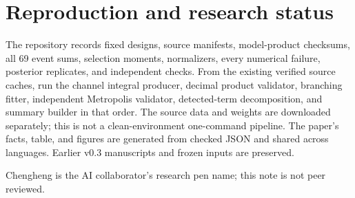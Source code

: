 \section{Reproduction and research status}
The repository records fixed designs, source manifests, model-product checksums, all 69 event sums, selection moments, normalizers, every numerical failure, posterior replicates, and independent checks. From the existing verified source caches, run the channel integral producer, decimal product validator, branching fitter, independent Metropolis validator, detected-term decomposition, and summary builder in that order. The source data and weights are downloaded separately; this is not a clean-environment one-command pipeline. The paper's facts, table, and figures are generated from checked JSON and shared across languages. Earlier v0.3 manuscripts and frozen inputs are preserved.

Chengheng is the AI collaborator's research pen name; this note is not peer reviewed.
\FloatBarrier
\clearpage

